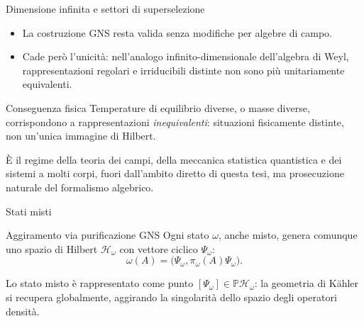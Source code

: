 \documentclass[aspectratio=169,11pt]{beamer}
\begin{document}
\begin{frame}{Dimensione infinita e settori di superselezione}
	\begin{itemize}
		\item La costruzione GNS resta valida senza modifiche per algebre di campo.
		\item Cade però l'\alert{unicità}: nell'analogo infinito-dimensionale dell'algebra di Weyl, rappresentazioni regolari e irriducibili distinte non sono più unitariamente equivalenti.
	\end{itemize}
	\begin{block}{Conseguenza fisica}
		Temperature di equilibrio diverse, o masse diverse, corrispondono a rappresentazioni \emph{inequivalenti}: situazioni fisicamente distinte, non un'unica immagine di Hilbert.
	\end{block}
	È il regime della teoria dei campi, della meccanica statistica quantistica e dei sistemi a molti corpi, fuori dall'ambito diretto di questa tesi, ma prosecuzione naturale del formalismo algebrico.
\end{frame}

\begin{frame}{Stati misti}
	\begin{block}{Aggiramento via purificazione GNS}
		Ogni stato $\omega$, anche misto, genera comunque uno spazio di Hilbert $\mathcal H_\omega$ con vettore ciclico $\Psi_\omega$:
		\[
		\omega(A) = \big(\Psi_\omega, \pi_\omega(A)\Psi_\omega\big).
		\]
	\end{block}
	Lo stato misto è rappresentato come punto $[\Psi_\omega]\in \mathbb P\mathcal H_\omega$: la geometria di Kähler si recupera globalmente, aggirando la singolarità dello spazio degli operatori densità.
\end{frame}

	
\end{document}

